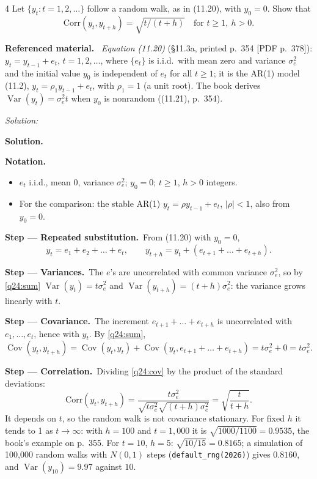 \documentclass[11pt,a4paper]{article}
\newif\ifsolucoes
\newcommand{\espacoresol}{4.5cm}   %
\numberwithin{equation}{questao}   %
\newenvironment{refmat}{\par\smallskip\noindent\small\textbf{Referenced material.}\ }{\par\smallskip}
\newenvironment{notacao}{\par\smallskip\noindent\textbf{Notation.}\begin{itemize}[leftmargin=1.4em,topsep=1pt,itemsep=0pt]\small}{\end{itemize}}
\newcommand{\resolespaco}{\ifsolucoes\else\par\textit{Solution:}\vspace{\espacoresol}\par\fi}
\newcommand{\passo}[2]{\par\smallskip\noindent\textbf{Step --- #1.}~#2}
\newcommand{\solhead}{\par\medskip\noindent{\color{blue!55!black}\rule{\linewidth}{0.3pt}}\par\noindent\textbf{Solution.}}
\newcommand{\Var}{\operatorname{Var}}
\newcommand{\Cov}{\operatorname{Cov}}
\begin{document}
4 Let $\{y_t:t=1,2,\dots\}$ follow a random walk, as in (11.20), with $y_0=0$. Show that
\[ \mathrm{Corr}(y_t,y_{t+h})=\sqrt{t/(t+h)}\quad\text{for } t\ge1,\ h>0. \]
\begin{refmat}
\emph{Equation (11.20)} (§11.3a, printed p.~354 [PDF p.~378]): $y_t=y_{t-1}+e_t$, $t=1,2,\dots$, where
$\{e_t\}$ is i.i.d.\ with mean zero and variance $\sigma_e^2$ and the initial value $y_0$ is independent of
$e_t$ for all $t\ge1$; it is the AR(1) model (11.2), $y_t=\rho_1y_{t-1}+e_t$, with $\rho_1=1$ (a unit
root). The book derives $\Var(y_t)=\sigma_e^2t$ when $y_0$ is nonrandom ((11.21), p.~354).
\end{refmat}
\resolespaco
\begin{sol}
\solhead
\begin{notacao}
\item $e_t$ i.i.d., mean 0, variance $\sigma_e^2$; $y_0=0$; $t\ge1$, $h>0$ integers.
\item For the comparison: the stable AR(1) $y_t=\rho y_{t-1}+e_t$, $|\rho|<1$, also from $y_0=0$.
\end{notacao}

\passo{Repeated substitution}{From (11.20) with $y_0=0$,}
\begin{equation}\label{q24:sum}
y_t=e_1+e_2+\dots+e_t,\qquad y_{t+h}=y_t+(e_{t+1}+\dots+e_{t+h}) .
\end{equation}

\passo{Variances}{The $e$'s are uncorrelated with common variance $\sigma_e^2$, so by \eqref{q24:sum}
$\Var(y_t)=t\sigma_e^2$ and $\Var(y_{t+h})=(t+h)\sigma_e^2$: the variance grows linearly with $t$.}

\passo{Covariance}{The increment $e_{t+1}+\dots+e_{t+h}$ is uncorrelated with $e_1,\dots,e_t$, hence
with $y_t$. By \eqref{q24:sum},}
\begin{equation}\label{q24:cov}
\Cov(y_t,y_{t+h})=\Cov(y_t,y_t)+\Cov(y_t,e_{t+1}+\dots+e_{t+h})=t\sigma_e^2+0=t\sigma_e^2 .
\end{equation}

\passo{Correlation}{Dividing \eqref{q24:cov} by the product of the standard deviations:}
\[
\mathrm{Corr}(y_t,y_{t+h})=\frac{t\sigma_e^2}{\sqrt{t\sigma_e^2}\sqrt{(t+h)\sigma_e^2}}=\sqrt{\frac{t}{t+h}} .
\]
It depends on $t$, so the random walk is not covariance stationary. For fixed $h$ it tends to 1 as
$t\to\infty$: with $h=100$ and $t=1{,}000$ it is $\sqrt{1000/1100}=0.9535$, the book's example on
p.~355. For $t=10$, $h=5$: $\sqrt{10/15}=0.8165$; a simulation of 100{,}000 random walks with $N(0,1)$
steps (\texttt{default\_rng(2026)}) gives $0.8160$, and $\Var(y_{10})=9.97$ against $10$.


\end{sol}
\end{document}
